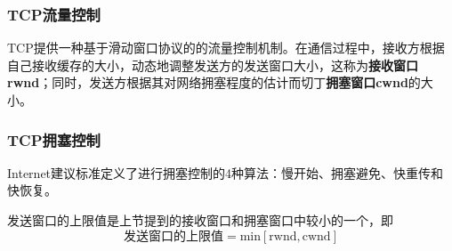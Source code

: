 \documentclass[12pt, a4paper, oneside]{ctexart}
\begin{document}
\subsubsection{TCP流量控制}

TCP提供一种基于滑动窗口协议的的流量控制机制。在通信过程中，接收方根据自己接收缓存的大小，动态地调整发送方的发送窗口大小，这称为\textbf{接收窗口rwnd}；同时，发送方根据其对网络拥塞程度的估计而切丁\textbf{拥塞窗口cwnd}的大小。

\subsubsection{TCP拥塞控制}

Internet建议标准定义了进行拥塞控制的4种算法：慢开始、拥塞避免、快重传和快恢复。

发送窗口的上限值是上节提到的接收窗口和拥塞窗口中较小的一个，即
\begin{equation*}
    \text{发送窗口的上限值}=\text{min}[\text{rwnd}, \text{cwnd}]
\end{equation*}
\end{document}
